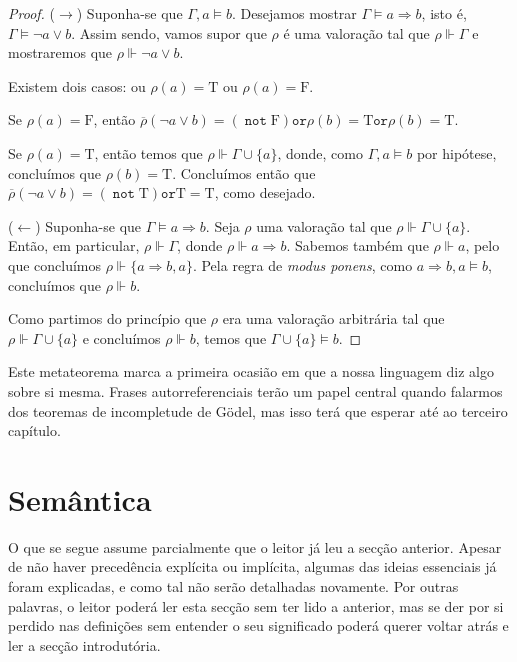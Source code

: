\documentclass{report}
\theoremstyle{definition}
\theoremstyle{remark}
\newcommand{\lt}{\mathrm{T}}
\newcommand{\lf}{\mathrm{F}}
\DeclareMathOperator{\pnot}{\texttt{not}}
\newcommand{\por}{\mathbin{\texttt{or}}}
\begin{document}
	\begin{proof}\label{dem:mtd}
	($\rightarrow$) Suponha-se que $\Gamma, a \vDash b$. Desejamos mostrar $\Gamma \vDash a \Rightarrow b$, isto é, $\Gamma \vDash \neg a \lor b$. Assim sendo, vamos supor que $\rho$ é uma valoração tal que $\rho \Vdash \Gamma$ e mostraremos que $\rho \Vdash \neg a \lor b$.
	
	Existem dois casos: ou $\rho(a) = \lt$ ou $\rho(a) = \lf$.
	
	Se $\rho(a) = \lf$, então $\overline\rho(\neg a \lor b) = (\pnot \lf) \por \rho(b) = \lt \por \rho(b) = \lt$.
	
	Se $\rho(a) = \lt$, então temos que $\rho \Vdash \Gamma \cup \{a\}$, donde, como $\Gamma, a \vDash b$ por hipótese, concluímos que $\rho(b) = \lt$. Concluímos então que $\overline\rho(\neg a \lor b) = (\pnot \lt) \por \lt = \lt$, como desejado.
	
	($\leftarrow$) Suponha-se que $\Gamma \vDash a \Rightarrow b$. Seja $\rho$ uma valoração tal que $\rho \Vdash \Gamma \cup \{a\}$. Então, em particular, $\rho \Vdash \Gamma$, donde $\rho \Vdash a \Rightarrow b$. Sabemos também que $\rho \Vdash a$, pelo que concluímos $\rho \Vdash \{a \Rightarrow b, a\}$. Pela regra de \textit{modus ponens}, como $a \Rightarrow b, a \vDash b$, concluímos que $\rho \Vdash b$.
	
	Como partimos do princípio que $\rho$ era uma valoração arbitrária tal que $\rho \Vdash \Gamma \cup \{a\}$ e concluímos $\rho \Vdash b$, temos que $\Gamma \cup \{a\} \vDash b$.
	\end{proof}
	
	Este metateorema marca a primeira ocasião em que a nossa linguagem diz algo sobre si mesma. Frases autorreferenciais terão um papel central quando falarmos dos teoremas de incompletude de Gödel, mas isso terá que esperar até ao terceiro capítulo.
	
	\section{Semântica}
	
	O que se segue assume parcialmente que o leitor já leu a secção anterior. Apesar de não haver precedência explícita ou implícita, algumas das ideias essenciais já foram explicadas, e como tal não serão detalhadas novamente. Por outras palavras, o leitor poderá ler esta secção sem ter lido a anterior, mas se der por si perdido nas definições sem entender o seu significado poderá querer voltar atrás e ler a secção introdutória.
	
\end{document}
